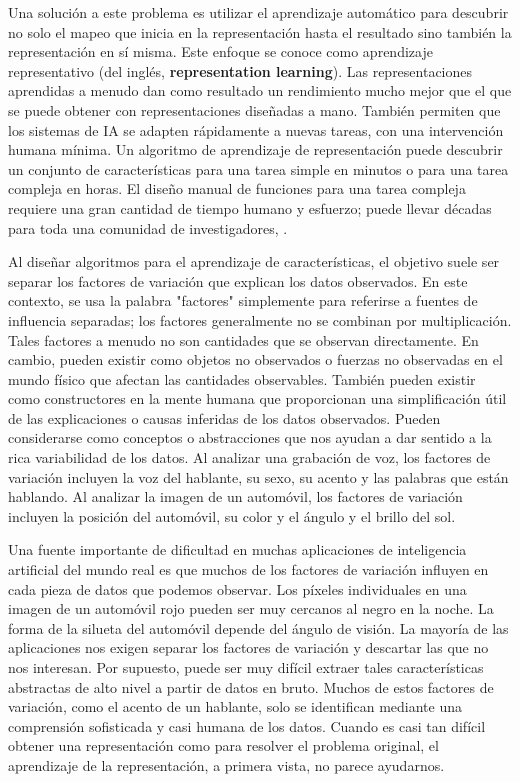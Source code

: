 	
	Una solución a este problema es utilizar el aprendizaje automático para descubrir no solo el mapeo que inicia en la representación hasta el resultado sino también la representación en sí misma. Este enfoque se conoce como aprendizaje representativo (del inglés, {\bf representation learning}). Las representaciones aprendidas a menudo dan como resultado un rendimiento mucho mejor que el que se puede obtener con representaciones diseñadas a mano. También permiten que los sistemas de IA se adapten rápidamente a nuevas tareas, con una intervención humana mínima. Un algoritmo de aprendizaje de representación puede descubrir un conjunto de características para una tarea simple en minutos o para una tarea compleja en horas. El diseño manual de funciones para una tarea compleja requiere una gran cantidad de tiempo humano y esfuerzo; puede llevar décadas para toda una comunidad de investigadores, \citep{Goodfellow-et-al-2016}.
	
	Al diseñar algoritmos para el aprendizaje de características, el objetivo suele ser separar los factores de variación que explican los datos observados. En este contexto, se usa la palabra "factores" simplemente para referirse a fuentes de influencia separadas; los factores generalmente no se combinan por multiplicación. Tales factores a menudo no son cantidades que se observan directamente. En cambio, pueden existir como objetos no observados o fuerzas no observadas en el mundo físico que afectan las cantidades observables. También pueden existir como constructores en la mente humana que proporcionan una simplificación útil de las explicaciones o causas inferidas de los datos observados. Pueden considerarse como conceptos o abstracciones que nos ayudan a dar sentido a la rica variabilidad de los datos. Al analizar una grabación de voz, los factores de variación incluyen la voz del hablante, su sexo, su acento y las palabras que están hablando. Al analizar la imagen de un automóvil, los factores de variación incluyen la posición del automóvil, su color y el ángulo y el brillo del sol.
	
	Una fuente importante de dificultad en muchas aplicaciones de inteligencia artificial del mundo real es que muchos de los factores de variación influyen en cada pieza de datos que podemos observar. Los píxeles individuales en una imagen de un automóvil rojo pueden ser muy cercanos al negro en la noche. La forma de la silueta del automóvil depende del ángulo de visión. La mayoría de las aplicaciones nos exigen separar los factores de variación y descartar las que no nos interesan. Por supuesto, puede ser muy difícil extraer tales características abstractas de alto nivel a partir de datos en bruto. Muchos de estos factores de variación, como el acento de un hablante, solo se identifican mediante una comprensión sofisticada y casi humana de los datos. Cuando es casi tan difícil obtener una representación como para resolver el problema original, el aprendizaje de la representación, a primera vista, no parece ayudarnos.
	
